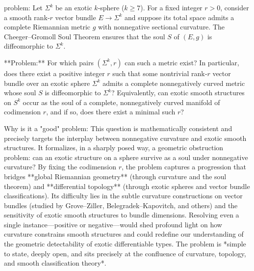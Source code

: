 problem:  
Let $\Sigma^k$ be an exotic $k$‑sphere ($k \ge 7$). For a fixed integer $r > 0$, consider a smooth rank‑$r$ vector bundle $E \to \Sigma^k$ and suppose its total space admits a complete Riemannian metric $g$ with nonnegative sectional curvature. The Cheeger–Gromoll Soul Theorem ensures that the soul $S$ of $(E,g)$ is diffeomorphic to $\Sigma^k$.  

**Problem:**  
For which pairs $(\Sigma^k, r)$ can such a metric exist? In particular, does there exist a positive integer $r$ such that some nontrivial rank‑$r$ vector bundle over an exotic sphere $\Sigma^k$ admits a complete nonnegatively curved metric whose soul $S$ is diffeomorphic to $\Sigma^k$?  
Equivalently, can exotic smooth structures on $S^k$ occur as the soul of a complete, nonnegatively curved manifold of codimension $r$, and if so, does there exist a minimal such $r$?  

Why is it a "good" problem:  
This question is mathematically consistent and precisely targets the interplay between nonnegative curvature and exotic smooth structures. It formalizes, in a sharply posed way, a geometric obstruction problem: can an exotic structure on a sphere survive as a soul under nonnegative curvature? By fixing the codimension $r$, the problem captures a progression that bridges **global Riemannian geometry** (through curvature and the soul theorem) and **differential topology** (through exotic spheres and vector bundle classifications).  
Its difficulty lies in the subtle curvature constructions on vector bundles (studied by Grove–Ziller, Belegradek–Kapovitch, and others) and the sensitivity of exotic smooth structures to bundle dimensions. Resolving even a single instance—positive or negative—would shed profound light on how curvature constrains smooth structures and could redefine our understanding of the geometric detectability of exotic differentiable types. The problem is *simple to state, deeply open, and sits precisely at the confluence of curvature, topology, and smooth classification theory*.